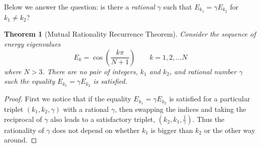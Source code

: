 \documentclass[prb, twocolumn, final]{revtex4-1}
\theoremstyle{plain}
\newtheorem*{theorem*}{Theorem}
\begin{document}
Below we answer the question: is there a {\emph{rational}} $\gamma$ such that
$E_{k_{1}} = \gamma E_{k_{2}}$ for $k_{1} \ne k_{2}$?

\begin{theorem*}[Mutual Rationality Recurrence Theorem]
    Consider the sequence of energy eigenvalues
    \begin{equation*}
        E_{k} = \cos{\!\left ( \frac{k \pi}{N+1} \right )}
        \qquad k=1, 2, \dots N
    \end{equation*}
    where $N >3$. There are no pair of integers, $k_{1}$ and $k_{2}$, and
    rational number $\gamma$ such the equality $E_{k_{1}} = \gamma E_{k_{2}}$ is
    satisfied.
\end{theorem*}
\begin{proof}
    First we notice that if the equality $E_{k_{1}} = \gamma E_{k_{2}}$ is
    satisfied for a particular triplet $(k_{1}, k_{2}, \gamma)$ with a rational
    $\gamma$, then swapping the indices and taking the reciprocal of $\gamma$
    also leads to a satisfactory triplet, $(k_{2}, k_{1}, \frac{1}{\gamma})$.
    Thus the rationality of $\gamma$ does not depend on whether $k_{1}$ is
    bigger than $k_{2}$ or the other way around.


\end{proof}
\end{document}
